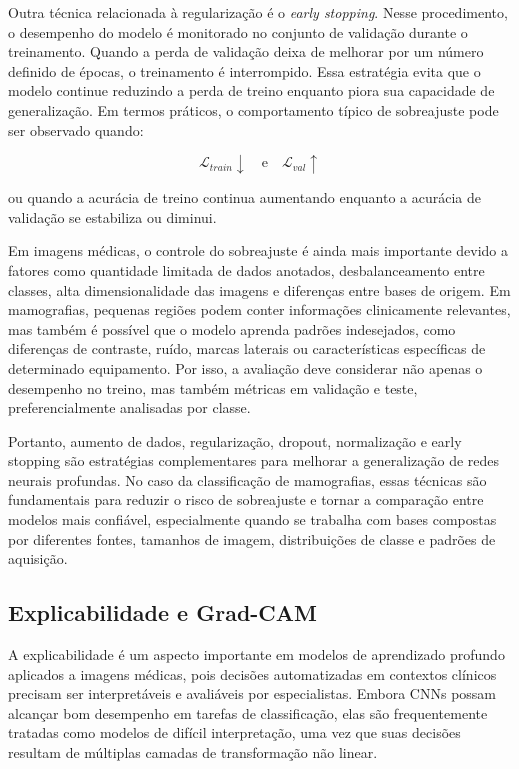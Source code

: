 \documentclass[
    12pt,
    openright,
    oneside,
    a4paper,
    english,
    brazil
]{abntex2}
\begin{document}
Outra técnica relacionada à regularização é o \textit{early stopping}. Nesse procedimento, o desempenho do modelo é monitorado no conjunto de validação durante o treinamento. Quando a perda de validação deixa de melhorar por um número definido de épocas, o treinamento é interrompido. Essa estratégia evita que o modelo continue reduzindo a perda de treino enquanto piora sua capacidade de generalização. Em termos práticos, o comportamento típico de sobreajuste pode ser observado quando:

\[
\mathcal{L}_{train} \downarrow
\quad \text{e} \quad
\mathcal{L}_{val} \uparrow
\]

ou quando a acurácia de treino continua aumentando enquanto a acurácia de validação se estabiliza ou diminui.

Em imagens médicas, o controle do sobreajuste é ainda mais importante devido a fatores como quantidade limitada de dados anotados, desbalanceamento entre classes, alta dimensionalidade das imagens e diferenças entre bases de origem. Em mamografias, pequenas regiões podem conter informações clinicamente relevantes, mas também é possível que o modelo aprenda padrões indesejados, como diferenças de contraste, ruído, marcas laterais ou características específicas de determinado equipamento. Por isso, a avaliação deve considerar não apenas o desempenho no treino, mas também métricas em validação e teste, preferencialmente analisadas por classe.

Portanto, aumento de dados, regularização, dropout, normalização e early stopping são estratégias complementares para melhorar a generalização de redes neurais profundas. No caso da classificação de mamografias, essas técnicas são fundamentais para reduzir o risco de sobreajuste e tornar a comparação entre modelos mais confiável, especialmente quando se trabalha com bases compostas por diferentes fontes, tamanhos de imagem, distribuições de classe e padrões de aquisição.

\subsection{Explicabilidade e Grad-CAM}

A explicabilidade é um aspecto importante em modelos de aprendizado profundo aplicados a imagens médicas, pois decisões automatizadas em contextos clínicos precisam ser interpretáveis e avaliáveis por especialistas. Embora CNNs possam alcançar bom desempenho em tarefas de classificação, elas são frequentemente tratadas como modelos de difícil interpretação, uma vez que suas decisões resultam de múltiplas camadas de transformação não linear.
\end{document}

